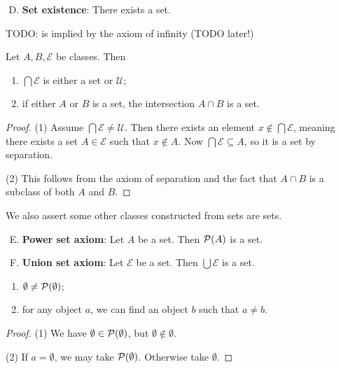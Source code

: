 \begin{enumerate}[(A)] \setcounter{enumi}{3}
\item \textbf{Set existence}: There exists a set.
\end{enumerate}
TODO: is implied by the axiom of infinity (TODO later!)

\begin{lemma}
Let $A,B, \mathcal{E}$ be classes. Then
\begin{enumerate}
\item $\bigcap\mathcal{E}$ is either a set or $\mathcal{U}$;
\item if either $A$ or $B$ is a set, the intersection $A \cap B$ is a set.
\end{enumerate}
\end{lemma}
\begin{proof}
(1) Assume $\bigcap\mathcal{E} \neq \mathcal{U}$. Then there exists an element $x\notin \bigcap\mathcal{E}$, meaning there exists a set $A\in \mathcal{E}$ such that $x\notin A$. Now $\bigcap\mathcal{E} \subseteq A$, so it is a set by separation. 

(2) This follows from the axiom of separation and the fact that $A \cap B$ is a subclass of both $A$ and $B$.
\end{proof}

We also assert some other classes constructed from sets are sets.

\begin{enumerate}[(A)] \setcounter{enumi}{4}
\item \textbf{Power set axiom}: Let $A$ be a set. Then $\operatorname{\mathcal{P}}(A)$ is a set.
\item \textbf{Union set axiom}: Let $\mathcal{E}$ be a set. Then $\bigcup\mathcal{E}$ is a set.
\end{enumerate}

\begin{lemma} \mbox{} \label{distinctElements}
\begin{enumerate}
\item $\emptyset \neq \operatorname{\mathcal{P}}(\emptyset)$;
\item for any object $a$, we can find an object $b$ such that $a \neq b$.
\end{enumerate}
\end{lemma}
\begin{proof}
(1) We have $\emptyset \in \operatorname{\mathcal{P}}(\emptyset)$, but $\emptyset \notin \emptyset$.

(2) If $a = \emptyset$, we may take $\operatorname{\mathcal{P}}(\emptyset)$. Otherwise take $\emptyset$.
\end{proof}

